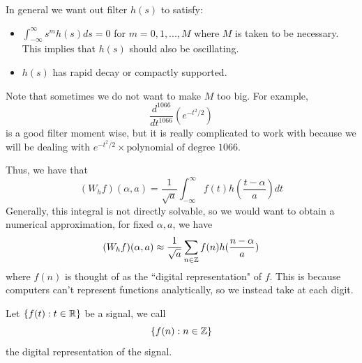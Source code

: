 \documentclass{article}
\begin{document}
In general we want out filter $h(s)$ to satisfy:
\begin{itemize}
    \item $\int_{-\infty}^\infty s^m h(s) ds = 0$ for $m = 0, 1, ..., M$ where $M$ is taken to be necessary. This implies that $h(s)$ should also be oscillating.
    \item $h(s)$ has rapid decay or compactly supported.
\end{itemize}

Note that sometimes we do not want to make $M$ too big. For example,
\[\frac{d^{1066}}{d t^{1066}} (e^{-t^2/2})\]
is a good filter moment wise, but it is really complicated to work with because we will be dealing with $e^{-t^2/2} \times \text{polynomial of degree $1066$}$.

Thus, we have that
\[(W_h f)(\alpha, a) = \frac{1}{\sqrt{a}} \int_{-\infty}^\infty f(t) h(\frac{t - \alpha}{a}) dt\]
Generally, this integral is not directly solvable, so we would want to obtain a numerical approximation, for fixed $\alpha, a$, we have
\[(W_h f)(\alpha, a) \approx \frac{1}{\sqrt{a}} \sum_{n \in \mathbb{Z}} f(n) h(\frac{n - \alpha}{a})\]
where $f(n)$ is thought of as the ``digital representation" of $f$. This is because computers can't represent functions analytically, so we instead take at each digit.

\begin{definition}
    Let $\{f(t): t \in \mathbb{R}\}$ be a signal, we call
    \[\{f(n): n \in \mathbb{Z}\}\]
    the digital representation of the signal.
\end{definition}
\end{document}
